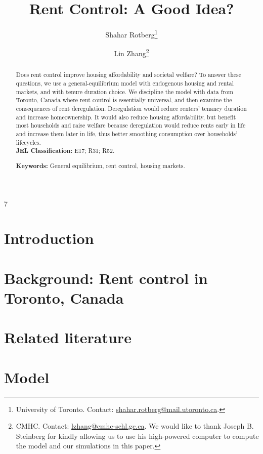 7\documentclass[parskip=full]{article}
\author{
  Shahar Rotberg\footnote{University of Toronto. Contact: \url{shahar.rotberg@mail.utoronto.ca}.} \and Lin Zhang\footnote{CMHC. Contact: \url{lzhang@cmhc-schl.gc.ca}. We would like to thank Joseph B. Steinberg for kindly allowing us to use his high-powered computer to compute the model and our simulations in this paper.}
}
\title{\vspace{-1.8cm}Rent Control: A Good Idea?}
\begin{document}
\maketitle

\begin{abstract}
\onehalfspacing
\noindent Does rent control improve housing affordability and societal welfare? To answer these questions, we use a general-equilibrium model with endogenous housing and rental markets, and with tenure duration choice. We discipline the model with data from Toronto, Canada where rent control is essentially universal, and then examine the consequences of rent deregulation. 
Deregulation would reduce renters' tenancy duration and increase homeownership. It would also reduce housing affordability, but benefit most households and raise welfare because deregulation would reduce rents early in life and increase them later in life, thus better smoothing consumption over households' lifecycles.\\[1.5ex]

\noindent \textbf{JEL Classification:} E17; R31; R52. 

\noindent \textbf{Keywords:} General equilibrium, rent control, housing markets.
\end{abstract}

\section{Introduction}

\section{Background: Rent control in Toronto, Canada}

\section{Related literature}

\section{Model}
\end{document}
